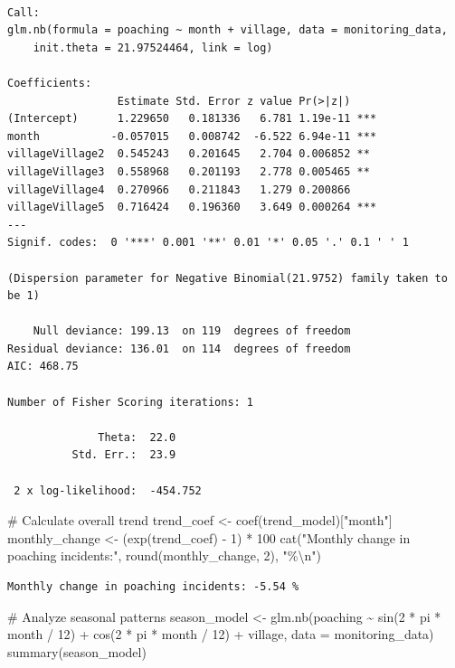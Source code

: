 \documentclass[
  letterpaper,
]{book}
\newenvironment{Shaded}{\begin{snugshade}}{\end{snugshade}}
\newcommand{\AttributeTok}[1]{\textcolor[rgb]{0.40,0.45,0.13}{#1}}
\newcommand{\CommentTok}[1]{\textcolor[rgb]{0.37,0.37,0.37}{#1}}
\newcommand{\DecValTok}[1]{\textcolor[rgb]{0.68,0.00,0.00}{#1}}
\newcommand{\FunctionTok}[1]{\textcolor[rgb]{0.28,0.35,0.67}{#1}}
\newcommand{\NormalTok}[1]{\textcolor[rgb]{0.00,0.23,0.31}{#1}}
\newcommand{\OtherTok}[1]{\textcolor[rgb]{0.00,0.23,0.31}{#1}}
\newcommand{\SpecialCharTok}[1]{\textcolor[rgb]{0.37,0.37,0.37}{#1}}
\newcommand{\StringTok}[1]{\textcolor[rgb]{0.13,0.47,0.30}{#1}}
\begin{document}
\begin{verbatim}

Call:
glm.nb(formula = poaching ~ month + village, data = monitoring_data, 
    init.theta = 21.97524464, link = log)

Coefficients:
                 Estimate Std. Error z value Pr(>|z|)    
(Intercept)      1.229650   0.181336   6.781 1.19e-11 ***
month           -0.057015   0.008742  -6.522 6.94e-11 ***
villageVillage2  0.545243   0.201645   2.704 0.006852 ** 
villageVillage3  0.558968   0.201193   2.778 0.005465 ** 
villageVillage4  0.270966   0.211843   1.279 0.200866    
villageVillage5  0.716424   0.196360   3.649 0.000264 ***
---
Signif. codes:  0 '***' 0.001 '**' 0.01 '*' 0.05 '.' 0.1 ' ' 1

(Dispersion parameter for Negative Binomial(21.9752) family taken to be 1)

    Null deviance: 199.13  on 119  degrees of freedom
Residual deviance: 136.01  on 114  degrees of freedom
AIC: 468.75

Number of Fisher Scoring iterations: 1

              Theta:  22.0 
          Std. Err.:  23.9 

 2 x log-likelihood:  -454.752 
\end{verbatim}

\begin{Shaded}
\begin{Highlighting}[]
\CommentTok{\# Calculate overall trend}
\NormalTok{trend\_coef }\OtherTok{\textless{}{-}} \FunctionTok{coef}\NormalTok{(trend\_model)[}\StringTok{"month"}\NormalTok{]}
\NormalTok{monthly\_change }\OtherTok{\textless{}{-}}\NormalTok{ (}\FunctionTok{exp}\NormalTok{(trend\_coef) }\SpecialCharTok{{-}} \DecValTok{1}\NormalTok{) }\SpecialCharTok{*} \DecValTok{100}
\FunctionTok{cat}\NormalTok{(}\StringTok{"Monthly change in poaching incidents:"}\NormalTok{, }\FunctionTok{round}\NormalTok{(monthly\_change, }\DecValTok{2}\NormalTok{), }\StringTok{"\%}\SpecialCharTok{\textbackslash{}n}\StringTok{"}\NormalTok{)}
\end{Highlighting}
\end{Shaded}

\begin{verbatim}
Monthly change in poaching incidents: -5.54 %
\end{verbatim}

\begin{Shaded}
\begin{Highlighting}[]
\CommentTok{\# Analyze seasonal patterns}
\NormalTok{season\_model }\OtherTok{\textless{}{-}} \FunctionTok{glm.nb}\NormalTok{(poaching }\SpecialCharTok{\textasciitilde{}} \FunctionTok{sin}\NormalTok{(}\DecValTok{2} \SpecialCharTok{*}\NormalTok{ pi }\SpecialCharTok{*}\NormalTok{ month }\SpecialCharTok{/} \DecValTok{12}\NormalTok{) }\SpecialCharTok{+} \FunctionTok{cos}\NormalTok{(}\DecValTok{2} \SpecialCharTok{*}\NormalTok{ pi }\SpecialCharTok{*}\NormalTok{ month }\SpecialCharTok{/} \DecValTok{12}\NormalTok{) }\SpecialCharTok{+}\NormalTok{ village, }
                      \AttributeTok{data =}\NormalTok{ monitoring\_data)}
\FunctionTok{summary}\NormalTok{(season\_model)}
\end{Highlighting}
\end{Shaded}
\end{document}
